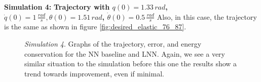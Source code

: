 \documentclass[a4paper]{article}
\begin{document}
\textbf{Simulation 4:} \textbf{Trajectory with $q(0)=1.33\, rad$, $\dot{q}(0)=1\, \frac{rad}{s}, \theta(0)=1.51\, rad$, $\dot{\theta}(0)=0.5\, \frac{rad}{s}$}
Also, in this case, the trajectory is the same as shown in figure \ref{fig:desired_elastic_76_87}.

\begin{figure}
    \centering
    \qquad
    \caption{\textit{Simulation 4}. Graphs of the trajectory, error, and energy conservation for the NN baseline and LNN. Again, we see a very similar situation to the simulation before this one the results show a trend towards improvement, even if minimal.}
    \label{fig:elastic_500_76_87}
\end{figure}
\end{document}
